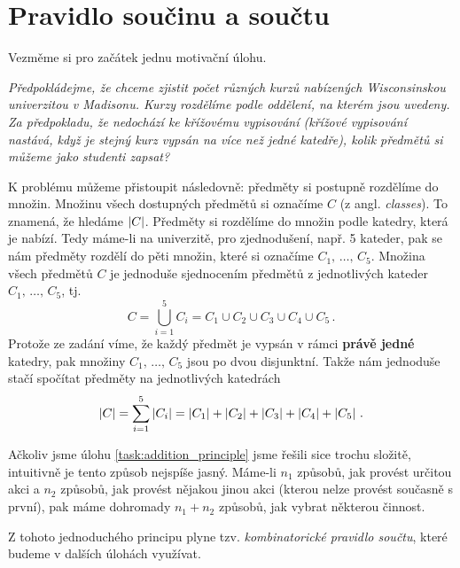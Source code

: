 \section{Pravidlo součinu a součtu}

Vezměme si pro začátek jednu motivační úlohu.

\begin{task}
    \textit{Předpokládejme, že chceme zjistit počet různých kurzů nabízených Wisconsinskou univerzitou v Madisonu. Kurzy rozdělíme podle oddělení, na kterém jsou uvedeny. Za předpokladu, že nedochází ke křížovému vypisování (křížové vypisování nastává, když je stejný kurz vypsán na více než jedné katedře), kolik předmětů si můžeme jako studenti zapsat?} \citep[str. 28]{Brualdi2018}
\end{task}

\begin{solution}\label{task:addition_principle}
    K problému můžeme přistoupit následovně: předměty si postupně rozdělíme do množin. Množinu všech dostupných předmětů si označíme $C$ (z angl. \emph{classes}). To znamená, že hledáme $\left| C \right|$. Předměty si rozdělíme do množin podle katedry, která je nabízí. Tedy máme-li na univerzitě, pro zjednodušení, např. 5 kateder, pak se nám předměty rozdělí do pěti množin, které si označíme $C_1,\,\dots,\, C_5$. Množina všech předmětů $C$ je jednoduše sjednocením předmětů z jednotlivých kateder $C_1,\,\dots,\, C_5$, tj.
    \begin{equation*}
        C=\bigcup\limits_{i=1}^{5}C_i=C_1\cup C_2\cup C_3\cup C_4\cup C_5\,.
    \end{equation*}
    Protože ze zadání víme, že každý předmět je vypsán v rámci \textbf{právě jedné} katedry, pak množiny $C_1,\,\dots,\, C_5$ jsou po dvou disjunktní. Takže nám jednoduše stačí spočítat předměty na jednotlivých katedrách
    \begin{equation*}
        \left| C \right|=\sum_{i=1}^{5}\left| C_i \right|=\left| C_1 \right|+\left| C_2 \right|+\left| C_3 \right|+\left| C_4 \right|+\left| C_5 \right|\,.
    \end{equation*}
\end{solution}

Ačkoliv jsme úlohu \ref{task:addition_principle} jsme řešili sice trochu složitě, intuitivně je tento způsob nejspíše jasný. Máme-li $n_1$ způsobů, jak provést určitou akci a $n_2$ způsobů, jak provést nějakou jinou akci (kterou nelze provést současně s první), pak máme dohromady $n_1+n_2$ způsobů, jak vybrat některou činnost.\par
Z tohoto jednoduchého principu plyne tzv. \emph{kombinatorické pravidlo součtu}, které budeme v dalších úlohách využívat.


